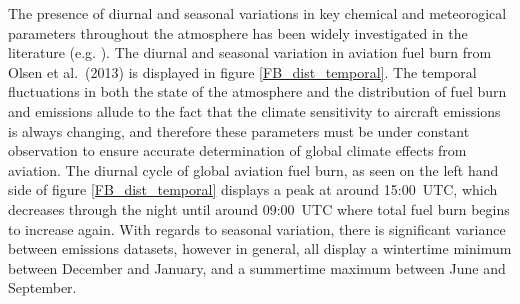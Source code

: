 

The presence of diurnal and seasonal variations in key chemical and meteorogical parameters throughout the atmosphere has been widely investigated in the literature (e.g. \cite{Schanz2021}). The diurnal and seasonal variation in aviation fuel burn from Olsen et al.\ (2013) \cite{Olsen2013} is displayed in figure \ref{FB_dist_temporal}. The temporal fluctuations in both the state of the atmosphere and the distribution of fuel burn and emissions allude to the fact that the climate sensitivity to aircraft emissions is always changing, and therefore these parameters must be under constant observation to ensure accurate determination of global climate effects from aviation. The diurnal cycle of global aviation fuel burn, as seen on the left hand side of figure \ref{FB_dist_temporal} displays a peak at around 15:00~UTC, which decreases through the night until around 09:00~UTC where total fuel burn begins to increase again. With regards to seasonal variation, there is significant variance between emissions datasets, however in general, all display a wintertime minimum between December and January, and a summertime maximum between June and September.

